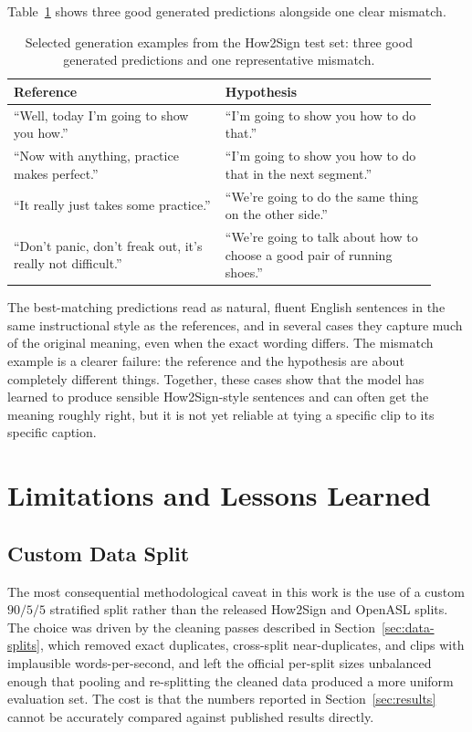 \documentclass{article}
\begin{document}
Table~\ref{tab:qualitative} shows three good generated predictions
alongside one clear mismatch.

\begin{table}[H]
\centering
\caption{Selected generation examples from the How2Sign test set: three good
generated predictions and one representative mismatch.}
\label{tab:qualitative}
\begin{tabular}{p{0.46\linewidth} p{0.46\linewidth}}
\toprule
Reference & Hypothesis \\
\midrule
``Well, today I'm going to show you how.''
  & ``I'm going to show you how to do that.'' \\[4pt]
``Now with anything, practice makes perfect.''
  & ``I'm going to show you how to do that in the next segment.'' \\[4pt]
``It really just takes some practice.''
  & ``We're going to do the same thing on the other side.'' \\
\midrule
``Don't panic, don't freak out, it's really not difficult.''
  & ``We're going to talk about how to choose a good pair of running shoes.'' \\
\bottomrule
\end{tabular}
\end{table}

The best-matching predictions read as natural, fluent English sentences in
the same instructional style as the references, and in several cases they
capture much of the original meaning, even when the exact wording differs.
The mismatch example is a clearer failure: the reference and the hypothesis
are about completely different things. Together, these cases show that the
model has learned to produce sensible How2Sign-style sentences and can often
get the meaning roughly right, but it is not yet reliable at tying a
specific clip to its specific caption.


\section{Limitations and Lessons Learned}
\label{sec:limitations}

\subsection{Custom Data Split}
\label{sec:lim-split}

The most consequential methodological caveat in this work is the use of a
custom $90/5/5$ stratified split rather than the released How2Sign and
OpenASL splits. The choice was driven by the cleaning passes described in
Section~\ref{sec:data-splits}, which removed exact duplicates, cross-split
near-duplicates, and clips with implausible words-per-second, and left the
official per-split sizes unbalanced enough that pooling and re-splitting the
cleaned data produced a more uniform evaluation set. The cost is that the
numbers reported in Section~\ref{sec:results} cannot be accurately compared
against published results directly.
\end{document}
